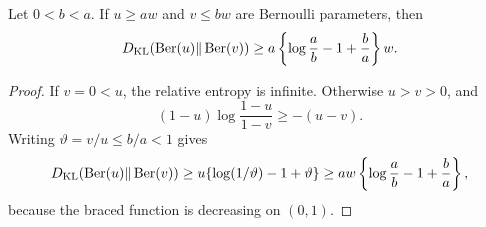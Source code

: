 \begin{lemma}
\label{lem:bernoulli-kl-linear-separation}
Let \(0<b<a\).  If \(u\ge aw\) and \(v\le bw\) are Bernoulli parameters,
then
\[
 D_{\rm KL}(\operatorname{Ber}(u)\|\operatorname{Ber}(v))
 \ge a\left\{\log\frac ab-1+\frac ba\right\}w.
\]
\end{lemma}

\begin{proof}
If \(v=0<u\), the relative entropy is infinite.  Otherwise \(u>v>0\), and
\[
 (1-u)\log\frac{1-u}{1-v}\ge-(u-v).
\]
Writing \(\vartheta=v/u\le b/a<1\) gives
\[
 D_{\rm KL}(\operatorname{Ber}(u)\|\operatorname{Ber}(v))
 \ge u\{\log(1/\vartheta)-1+\vartheta\}
 \ge aw\left\{\log\frac ab-1+\frac ba\right\},
\]
because the braced function is decreasing on \((0,1)\).
\end{proof}
